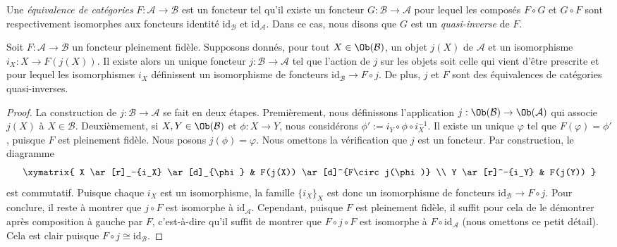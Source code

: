 \begin{definition}
\label{definition-equivalence-categories}
Une {\it équivalence de catégories}
$F : \mathcal{A} \to \mathcal{B}$ est un foncteur tel qu'il existe
un foncteur $G : \mathcal{B} \to \mathcal{A}$ pour lequel
les composés $F \circ G$ et $G \circ F$ sont respectivement isomorphes aux
foncteurs identité $\text{id}_\mathcal{B}$ et
$\text{id}_\mathcal{A}$.
Dans ce cas, nous disons que $G$ est un {\it quasi-inverse} de $F$.
\end{definition}

\begin{lemma}
\label{lemma-construct-quasi-inverse}
Soit $F : \mathcal{A} \to \mathcal{B}$ un foncteur pleinement fidèle.
Supposons donnés, pour tout $X \in \Ob(\mathcal{B})$, un
objet $j(X)$ de $\mathcal{A}$ et un isomorphisme $i_X : X \to F(j(X))$.
Il existe alors un unique foncteur $j : \mathcal{B} \to \mathcal{A}$
tel que l'action de $j$ sur les objets soit celle qui vient d'être prescrite et
pour lequel les isomorphismes
$i_X$ définissent un isomorphisme de foncteurs
$\text{id}_\mathcal{B} \to F \circ j$. De plus, $j$ et $F$
sont des équivalences de catégories quasi-inverses.
\end{lemma}

\begin{proof}
La construction de $j : \mathcal{B} \to \mathcal{A}$ se fait en deux étapes.
Premièrement, nous définissons l'application
$j : \Ob(\mathcal{B}) \to \Ob(\mathcal{A})$ qui associe
$j(X)$ à $X \in \mathcal{B}$. Deuxièmement, si
$X,Y \in \Ob(\mathcal{B})$ et $\phi : X \to Y$, nous considérons
$\phi' := i_Y \circ\phi\circ i_X^{-1}$. Il existe un unique
$\varphi$ tel que $F(\varphi) = \phi'$, puisque $F$ est pleinement fidèle.
Nous posons $j(\phi) = \varphi$. Nous omettons la vérification que $j$
est un foncteur. Par construction, le diagramme
$$
\xymatrix{
X \ar[r]_-{i_X} \ar[d]_{\phi}
&
F(j(X)) \ar[d]^{F\circ j(\phi)}
\\
Y \ar[r]^-{i_Y}
&
F(j(Y))
}
$$
est commutatif. Puisque chaque $i_X$ est un isomorphisme, la famille
$\{i_X\}_X$ est donc un isomorphisme de foncteurs
$\text{id}_\mathcal{B} \to F\circ j$. Pour conclure, il reste à montrer que
$j \circ F$ est isomorphe à $\text{id}_\mathcal{A}$.
Cependant, puisque $F$ est pleinement fidèle, il suffit pour cela de le
démontrer après composition à gauche par $F$, c'est-à-dire qu'il suffit de
montrer que $F \circ j \circ F$ est isomorphe à
$F \circ \text{id}_\mathcal{A}$
(nous omettons ce petit détail). Cela est clair puisque
$F \circ j \cong \text{id}_\mathcal{B}$.
\end{proof}

